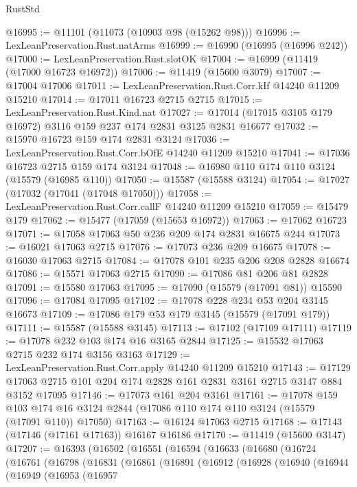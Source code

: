 \begin{lexlean}{RustStd}
\begin{coremodule}
@16995 := @11101 (@11073 (@10903 @98 (@15262 @98)))
@16996 := LexLeanPreservation.Rust.natArms
@16999 := @16990 (@16995 (@16996 @242))
@17000 := LexLeanPreservation.Rust.slotOK
@17004 := @16999 (@11419 (@17000 @16723 @16972))
@17006 := @11419 (@15600 @3079)
@17007 := @17004 @17006
@17011 := LexLeanPreservation.Rust.Corr.kIf @14240 @11209 @15210
@17014 := @17011 @16723 @2715 @2715
@17015 := LexLeanPreservation.Rust.Kind.nat
@17027 := @17014 (@17015 @3105 @179 @16972) @3116 @159 @237 @174 @2831 @3125 @2831 @16677
@17032 := @15970 @16723 @159 @174 @2831 @3124
@17036 := LexLeanPreservation.Rust.Corr.bOfE @14240 @11209 @15210
@17041 := @17036 @16723 @2715 @159 @174 @3124
@17048 := @16980 @110 @174 @110 @3124 (@15579 (@16985 @110))
@17050 := @15587 (@15588 @3124)
@17054 := @17027 (@17032 (@17041 (@17048 @17050)))
@17058 := LexLeanPreservation.Rust.Corr.callF @14240 @11209 @15210
@17059 := @15479 @179
@17062 := @15477 (@17059 (@15653 @16972))
@17063 := @17062 @16723
@17071 := @17058 @17063 @50 @236 @209 @174 @2831 @16675 @244
@17073 := @16021 @17063 @2715
@17076 := @17073 @236 @209 @16675
@17078 := @16030 @17063 @2715
@17084 := @17078 @101 @235 @206 @208 @2828 @16674
@17086 := @15571 @17063 @2715
@17090 := @17086 @81 @206 @81 @2828
@17091 := @15580 @17063
@17095 := @17090 (@15579 (@17091 @81)) @15590
@17096 := @17084 @17095
@17102 := @17078 @228 @234 @53 @204 @3145 @16673
@17109 := @17086 @179 @53 @179 @3145 (@15579 (@17091 @179))
@17111 := @15587 (@15588 @3145)
@17113 := @17102 (@17109 @17111)
@17119 := @17078 @232 @103 @174 @16 @3165 @2844
@17125 := @15532 @17063 @2715 @232 @174 @3156 @3163
@17129 := LexLeanPreservation.Rust.Corr.apply @14240 @11209 @15210
@17143 := @17129 @17063 @2715 @101 @204 @174 @2828 @161 @2831 @3161 @2715 @3147 @884 @3152 @17095
@17146 := @17073 @161 @204 @3161
@17161 := @17078
    @159
    @103
    @174
    @16
    @3124
    @2844
    (@17086 @110 @174 @110 @3124 (@15579 (@17091 @110)) @17050)
@17163 := @16124 @17063 @2715
@17168 := @17143 (@17146 (@17161 @17163)) @16167 @16186
@17170 := @11419 (@15600 @3147)
@17207 := @16393
    (@16502
      (@16551
        (@16594
          (@16633
            (@16680
              (@16724
                (@16761
                  (@16798
                    (@16831
                      (@16861
                        (@16891
                          (@16912
                            (@16928
                              (@16940
                                (@16944
                                  (@16949
                                    (@16953
                                      (@16957

\end{coremodule}
\end{lexlean}

